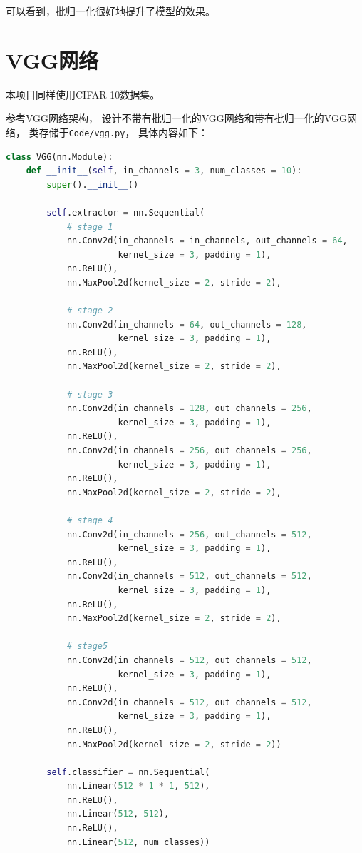 \documentclass{article}
\begin{document}
可以看到，批归一化很好地提升了模型的效果。

\section{VGG网络}

本项目同样使用CIFAR-10数据集。

参考VGG网络架构，
设计不带有批归一化的VGG网络和带有批归一化的VGG网络，
类存储于\verb|Code/vgg.py|，
具体内容如下：

\begin{lstlisting}[language=python]
class VGG(nn.Module):
    def __init__(self, in_channels = 3, num_classes = 10):
        super().__init__()

        self.extractor = nn.Sequential(
            # stage 1
            nn.Conv2d(in_channels = in_channels, out_channels = 64, 
                      kernel_size = 3, padding = 1),
            nn.ReLU(),
            nn.MaxPool2d(kernel_size = 2, stride = 2),

            # stage 2
            nn.Conv2d(in_channels = 64, out_channels = 128, 
                      kernel_size = 3, padding = 1),
            nn.ReLU(),
            nn.MaxPool2d(kernel_size = 2, stride = 2),

            # stage 3
            nn.Conv2d(in_channels = 128, out_channels = 256, 
                      kernel_size = 3, padding = 1),
            nn.ReLU(),
            nn.Conv2d(in_channels = 256, out_channels = 256, 
                      kernel_size = 3, padding = 1),
            nn.ReLU(),
            nn.MaxPool2d(kernel_size = 2, stride = 2),

            # stage 4
            nn.Conv2d(in_channels = 256, out_channels = 512, 
                      kernel_size = 3, padding = 1),
            nn.ReLU(),
            nn.Conv2d(in_channels = 512, out_channels = 512, 
                      kernel_size = 3, padding = 1),
            nn.ReLU(),
            nn.MaxPool2d(kernel_size = 2, stride = 2),

            # stage5
            nn.Conv2d(in_channels = 512, out_channels = 512, 
                      kernel_size = 3, padding = 1),
            nn.ReLU(),
            nn.Conv2d(in_channels = 512, out_channels = 512, 
                      kernel_size = 3, padding = 1),
            nn.ReLU(),
            nn.MaxPool2d(kernel_size = 2, stride = 2))

        self.classifier = nn.Sequential(
            nn.Linear(512 * 1 * 1, 512),
            nn.ReLU(),
            nn.Linear(512, 512),
            nn.ReLU(),
            nn.Linear(512, num_classes))


\end{lstlisting}
\end{document}
